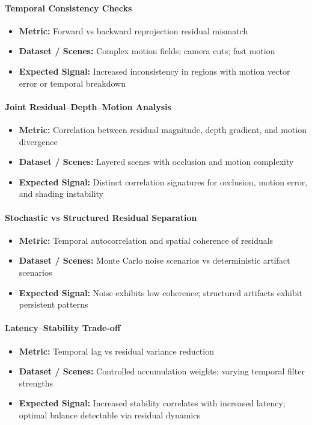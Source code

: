 \documentclass[11pt,letterpaper]{article}
\theoremstyle{gcresult}
\theoremstyle{definition}
\begin{document}
\paragraph{Temporal Consistency Checks}
\begin{itemize}
    \item \textbf{Metric:} Forward vs backward reprojection residual mismatch
    \item \textbf{Dataset / Scenes:} Complex motion fields; camera cuts; fast motion
    \item \textbf{Expected Signal:} Increased inconsistency in regions with motion vector error or temporal breakdown
\end{itemize}

\paragraph{Joint Residual–Depth–Motion Analysis}
\begin{itemize}
    \item \textbf{Metric:} Correlation between residual magnitude, depth gradient, and motion divergence
    \item \textbf{Dataset / Scenes:} Layered scenes with occlusion and motion complexity
    \item \textbf{Expected Signal:} Distinct correlation signatures for occlusion, motion error, and shading instability
\end{itemize}

\paragraph{Stochastic vs Structured Residual Separation}
\begin{itemize}
    \item \textbf{Metric:} Temporal autocorrelation and spatial coherence of residuals
    \item \textbf{Dataset / Scenes:} Monte Carlo noise scenarios vs deterministic artifact scenarios
    \item \textbf{Expected Signal:} Noise exhibits low coherence; structured artifacts exhibit persistent patterns
\end{itemize}

\paragraph{Latency–Stability Trade-off}
\begin{itemize}
    \item \textbf{Metric:} Temporal lag vs residual variance reduction
    \item \textbf{Dataset / Scenes:} Controlled accumulation weights; varying temporal filter strengths
    \item \textbf{Expected Signal:} Increased stability correlates with increased latency; optimal balance detectable via residual dynamics
\end{itemize}
\end{document}

